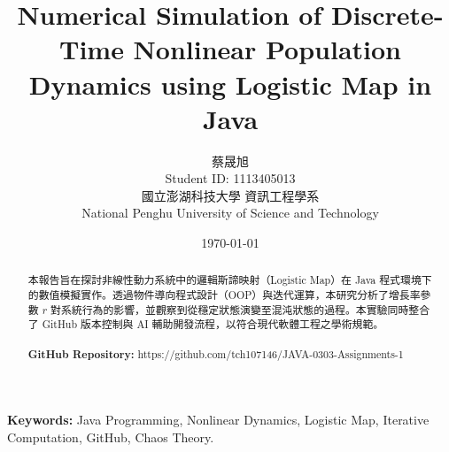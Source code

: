 \documentclass[11pt, a4paper]{article}
\title{\textbf{Numerical Simulation of Discrete-Time Nonlinear Population Dynamics using Logistic Map in Java}}
\author{蔡晟旭 \\ 
Student ID: 1113405013 \\
國立澎湖科技大學 資訊工程學系 \\
National Penghu University of Science and Technology}
\date{\today}
\begin{document}
\maketitle


\begin{abstract}
本報告旨在探討非線性動力系統中的邏輯斯諦映射（Logistic Map）在 Java 程式環境下的數值模擬實作。透過物件導向程式設計（OOP）與迭代運算，本研究分析了增長率參數 $r$ 對系統行為的影響，並觀察到從穩定狀態演變至混沌狀態的過程。本實驗同時整合了 GitHub 版本控制與 AI 輔助開發流程，以符合現代軟體工程之學術規範。
\\ \\

\textbf{GitHub Repository:} https://github.com/tch107146/JAVA-0303-Assignments-1
\end{abstract}


\noindent \textbf{Keywords:} Java Programming, Nonlinear Dynamics, Logistic Map, Iterative Computation, GitHub, Chaos Theory.
\end{document}
